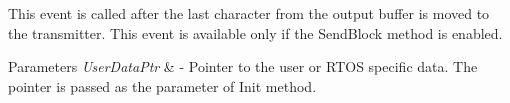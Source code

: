 This event is called after the last character from the output buffer is moved to the transmitter. This event is available only if the Send\-Block method is enabled. 


\begin{DoxyParams}{Parameters}
{\em User\-Data\-Ptr} & -\/ Pointer to the user or R\-T\-O\-S specific data. The pointer is passed as the parameter of Init method. \\
\hline
\end{DoxyParams}
